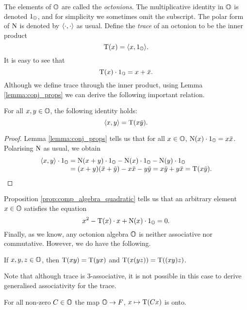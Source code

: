 The elements of $\mathbb{O}$ are called the \textit{octonions}. 
The multiplicative identity in $\mathbb{O}$ is denoted $1_{\mathbb{O}}$, and for simplicity we sometimes omit the subscript. The polar form of $\mathord{\mathrm{N}}$ is denoted by $\langle \cdot, \cdot \rangle$ as usual. Define the 
\textit{trace} of an octonion to be the inner product
\begin{equation}
	\operatorname{T}(x) = \langle x, 1_{\mathbb{O}} \rangle.
\end{equation}
It is easy to see that
\begin{equation}
	\operatorname{T}(x)\cdot 1_{\mathbb{O}} = x + \mathord{\mbox{\hspace*{0pt}}\,\overline{\!x\!\!\;}\!\:}\mbox{\hspace*{0pt}}. 
\end{equation}
Although we define trace through the inner product, using Lemma \ref{lemma:conj_props} we can
derive the following important relation.
\begin{lemma}
	For all $x,y \in \mathbb{O}$, the following identity holds:
	\begin{equation}
		\langle x, y \rangle = \operatorname{T}(x\mathord{\mbox{\hspace*{0pt}}\,\overline{\!y\!\!\;}\!\:}\mbox{\hspace*{0pt}}).
	\end{equation}
\end{lemma}
\begin{proof}
	Lemma \ref{lemma:conj_props} tells us that for all $x \in \mathbb{O}$, $\mathord{\mathrm{N}}(x)\cdot 1_{\mathbb{O}} = x \mathord{\mbox{\hspace*{0pt}}\,\overline{\!x\!\!\;}\!\:}\mbox{\hspace*{0pt}}$.
	Polarising $\mathord{\mathrm{N}}$ as usual, we obtain
	\begin{equation*}
		\begin{array}{r@{\;}c@{\;}l}
			\inner{x}{y}\cdot 1_{\O} & = & \NN(x+y)\cdot 1_{\O} - \NN(x)\cdot 1_{\O} - 
												\NN(y)\cdot 1_{\O} \\
												
					& = & (x + y)(\ovx + \ovy) - x\ovx - y\ovy = x\ovy + y\ovx = \Tr(x\ovy). 
		\end{array}
	\end{equation*}
\end{proof}
Proposition \ref{prop:comp_algebra_quadratic} tells us that an arbitrary element $x \in \mathbb{O}$
satisfies the equation
\begin{equation}
	x^2 - \operatorname{T}(x)\cdot x + \mathord{\mathrm{N}}(x)\cdot 1_{\mathbb{O}} = 0.
\end{equation}
Finally, as we know, any octonion algebra $\mathbb{O}$ is neither associative nor commutative. However,
we do have the following.
\begin{lemma}
	If $x,y,z \in \mathbb{O}$, then $\operatorname{T}(xy) = \operatorname{T}(yx)$ and $\operatorname{T}(x(yz)) = \operatorname{T}((xy) z)$. 
\end{lemma}
Note that although trace is $3$-associative, it is not possible in this case to derive
generalised associativity for the trace. 

\begin{lemma}
	For all non-zero $C \in \mathbb{O}$ the map $\mathbb{O} \rightarrow F$, $x \mapsto \operatorname{T}(Cx)$ is onto.
\end{lemma}

